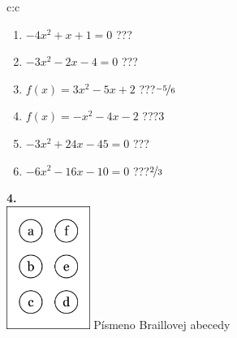 \documentclass[10pt]{report}
\begin{document}
\begin{tabular}{c:c}
\begin{minipage}[c][104.5mm][t]{0.5\linewidth}
\begin{center}
\begin{minipage}{0.79\linewidth}
\begin{center}
\begin{varwidth}{\linewidth}
\begin{enumerate}
\Large
\item $-4x^2+x+1=0$\quad \dotfill\; ???\;\dotfill {}
\item $-3x^2-2x-4=0$\quad \dotfill\; ???\;\dotfill {}
\item $f(x)=3x^2-5x+2$\quad \dotfill\; ???\;\dotfill \quad $\nicefrac{-5}{6}$
\item $f(x)=-x^2-4x-2$\quad \dotfill\; ???\;\dotfill \quad $3$
\item $-3x^2+24x-45=0$\quad \dotfill\; ???\;\dotfill {}
\item $-6x^2-16x-10=0$\quad \dotfill\; ???\;\dotfill \quad $\nicefrac{2}{3}$
\end{enumerate}
\end{varwidth}
\end{center}
\end{minipage}
\begin{minipage}{0.20\linewidth}
\begin{center}
{\Huge\bfseries 4.} \\[2mm]
\includegraphics[height=40mm]{../images/braille.png}
{\small Písmeno Braillovej abecedy}
\end{center}
\end{minipage}
\end{center}
\end{minipage}
%
\end{tabular}
\newpage
\thispagestyle{empty}
\end{document}

